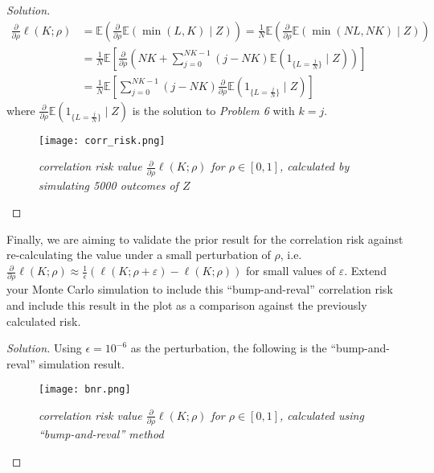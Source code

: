 \documentclass[10pt]{article}
\newcommand{\E}{\mathbb{E}}
\newenvironment{problem}[2][Problem]{\begin{trivlist}
\item[\hskip \labelsep {\bfseries #1}\hskip \labelsep {\bfseries #2.}]}{\end{trivlist}}
\begin{document}
\begin{proof}[Solution]
    \begin{align*}
        \frac{\partial}{\partial \rho} \ell(K;\rho) &= \E \left( \frac{\partial}{\partial \rho} \E(\min(L, K) \mid Z) \right) = \frac{1}{N} \E \left( \frac{\partial}{\partial \rho} \E(\min(NL, NK) \mid Z) \right) \\
        &= \frac{1}{N} \E \left[ \frac{\partial}{\partial \rho} \left( NK + \sum_{j=0}^{NK-1} (j-NK) \E \left( 1_{\{L = \frac{j}{N}\}} \mid Z \right) \right) \right] \\
        &= \frac{1}{N} \E \left[ \sum_{j=0}^{NK-1} (j-NK) \frac{\partial}{\partial \rho} \E \left( 1_{\{L = \frac{j}{N}\}} \mid Z \right) \right]
    \end{align*}
    where $\frac{\partial}{\partial \rho} \E \left( 1_{\{L = \frac{j}{N}\}} \mid Z \right)$ is the solution to \textit{Problem 6} with $k = j$.

    \begin{figure}[H]
        \begin{center}
            \texttt{[image: corr\_risk.png]}
            \caption{\textit{correlation risk value $\frac{\partial}{\partial \rho} \ell(K;\rho)$ for $\rho \in [0, 1]$, calculated by simulating 5000 outcomes of $Z$}}
            \label{fig:corr_risk}
        \end{center}
    \end{figure}
\end{proof}



\begin{problem}{10}
    Finally, we are aiming to validate the prior result for the correlation risk against re-calculating the value under a small perturbation of $\rho$, i.e. $\frac{\partial}{\partial \rho} \ell(K; \rho) \approx \frac{1}{\epsilon} (\ell(K; \rho + \varepsilon) - \ell(K; \rho))$ for small values of $\varepsilon$.
    Extend your Monte Carlo simulation to include this ``bump-and-reval'' correlation risk and include this result in the plot as a comparison against the previously calculated risk.
\end{problem}

\begin{proof}[Solution]
    Using $\epsilon = 10^{-6}$ as the perturbation, the following is the ``bump-and-reval'' simulation result.
    
    \begin{figure}[H]
        \begin{center}
            \texttt{[image: bnr.png]}
            \caption{\textit{correlation risk value $\frac{\partial}{\partial \rho} \ell(K;\rho)$ for $\rho \in [0, 1]$, calculated using ``bump-and-reval'' method}}
            \label{fig:bnr}
        \end{center}
    \end{figure}
\end{proof}
\end{document}
